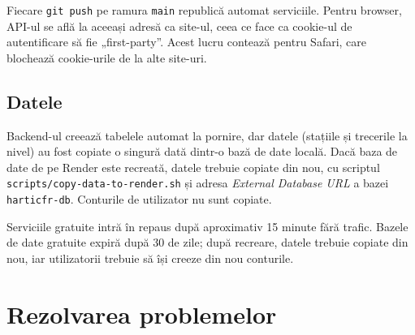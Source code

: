 \documentclass[11pt,a4paper]{article}
\newcommand{\code}[1]{\texttt{#1}}
\newcommand{\file}[1]{\texttt{#1}}
\begin{document}
Fiecare \code{git push} pe ramura \code{main} republică automat serviciile.
Pentru browser, API-ul se află la aceeași adresă ca site-ul, ceea ce face ca
cookie-ul de autentificare să fie „first-party”. Acest lucru contează pentru
Safari, care blochează cookie-urile de la alte site-uri.

\subsection{Datele}
\label{sec:data}

Backend-ul creează tabelele automat la pornire, dar datele (stațiile și
trecerile la nivel) au fost copiate o singură dată dintr-o bază de date
locală. Dacă baza de date de pe Render este recreată, datele trebuie copiate
din nou, cu scriptul \file{scripts/copy-data-to-render.sh} și adresa
\emph{External Database URL} a bazei \code{harticfr-db}. Conturile de
utilizator nu sunt copiate.

\begin{warning}
Serviciile gratuite intră în repaus după aproximativ 15 minute fără trafic.
Bazele de date gratuite expiră după 30 de zile; după recreare, datele trebuie
copiate din nou, iar utilizatorii trebuie să își creeze din nou conturile.
\end{warning}

\section{Rezolvarea problemelor}
\end{document}
